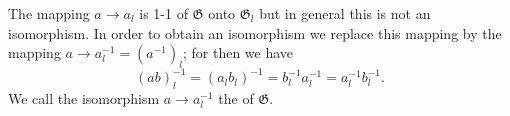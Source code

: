 The mapping $a \to a_l$ is 1-1 of $\mathfrak{G}$ onto $\mathfrak{G}_l$ but in general this is not an isomorphism. In order to obtain an isomorphism we replace this mapping by the mapping $a \to a_l^{-1} = (a^{-1})_l$; for then we have
$$(ab)_l^{-1} = (a_l b_l)^{-1} = b_l^{-1} a_l^{-1} = a_l^{-1} b_l^{-1}.$$
We call the isomorphism $a \to a_l^{-1}$ the  of $\mathfrak{G}$.
